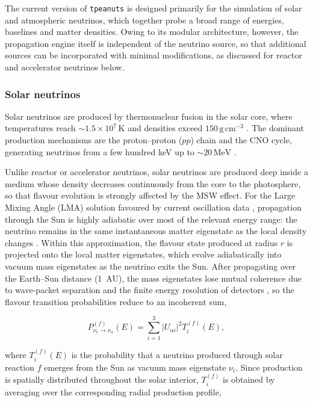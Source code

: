 The current version of \texttt{tpeanuts} is designed primarily for the simulation of solar and atmospheric neutrinos, which together probe a broad range of energies, baselines and matter densities. Owing to its modular architecture, however, the propagation engine itself is independent of the neutrino source, so that additional sources can be incorporated with minimal modifications, as discussed for reactor and accelerator neutrinos below.

\subsubsection{Solar neutrinos}

Solar neutrinos are produced by thermonuclear fusion in the solar core, where temperatures reach \(\sim 1.5\times10^{7}\,\mathrm{K}\) and densities exceed \(150\,\mathrm{g\,cm^{-3}}\) \parencite{Vinyoles2017}. The dominant production mechanisms are the proton--proton (\(pp\)) chain and the CNO cycle, generating neutrinos from a few hundred keV up to \(\sim20\,\mathrm{MeV}\) \parencite{Vinyoles2017}.

Unlike reactor or accelerator neutrinos, solar neutrinos are produced deep inside a medium whose density decreases continuously from the core to the photosphere, so that flavour evolution is strongly affected by the MSW effect. For the Large Mixing Angle (LMA) solution favoured by current oscillation data \parencite{NuFit52}, propagation through the Sun is highly adiabatic over most of the relevant energy range: the neutrino remains in the same instantaneous matter eigenstate as the local density changes \parencite{Haxton1986}. Within this approximation, the flavour state produced at radius \(r\) is projected onto the local matter eigenstates, which evolve adiabatically into vacuum mass eigenstates as the neutrino exits the Sun. After propagating over the Earth--Sun distance (1~AU), the mass eigenstates lose mutual coherence due to wave-packet separation and the finite energy resolution of detectors \parencite{Giunti2007}, so the flavour transition probabilities reduce to an incoherent sum,

\begin{equation}
  P_{\nu_e\to\nu_\alpha}^{(f)}(E) =
  \sum_{i=1}^{3}
  |U_{\alpha i}|^2 T_i^{(f)}(E),
\end{equation}

where \(T_i^{(f)}(E)\) is the probability that a neutrino produced through solar reaction \(f\) emerges from the Sun as vacuum mass eigenstate \(\nu_i\). Since production is spatially distributed throughout the solar interior, \(T_i^{(f)}\) is obtained by averaging over the corresponding radial production profile,

